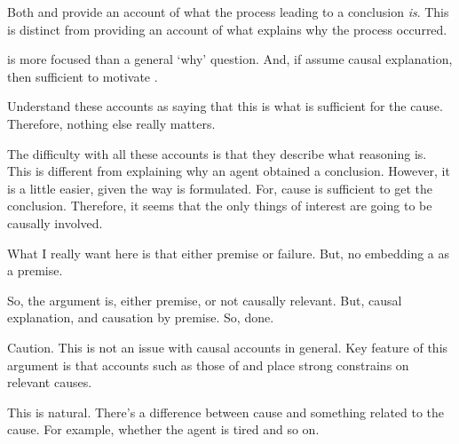 \begin{note}
  Both \citeauthor{Armstrong:1968vh} and \citeauthor{Broome:2013aa} provide an account of what the process leading to a conclusion \emph{is}.
  This is distinct from providing an account of what explains why the process occurred.

  \qWhyV{} is more focused than a general `why' question.
  And, if assume causal explanation, then sufficient to motivate \issueConstraint{}.
\end{note}

\begin{note}
  \color{blue}
  Understand these accounts as saying that this is what is sufficient for the cause.
  Therefore, nothing else really matters.

  The difficulty with all these accounts is that they describe what reasoning is.
  This is different from explaining why an agent obtained a conclusion.
  However, it is a little easier, given the way \qWhyV{} is formulated.
  For, cause is sufficient to get the conclusion.
  Therefore, it seems that the only things of interest are going to be causally involved.
\end{note}

\begin{note}
  \color{red}

  What I really want here is that either premise or failure.
  But, no embedding a \ros{} as a premise.


  So, the argument is, either premise, or not causally relevant.
  But, causal explanation, and causation by premise.
  So, done.
\end{note}

\begin{note}
  Caution.
  This is not an issue with causal accounts in general.
  Key feature of this argument is that accounts such as those of \citeauthor{Armstrong:1968vh} and \citeauthor{Broome:2013aa} place strong constrains on relevant causes.

  This is natural.
  There's a difference between cause and something related to the cause.
  For example, whether the agent is tired and so on.
\end{note}



\subsection*{\textcite{Boghossian:2014aa}}

